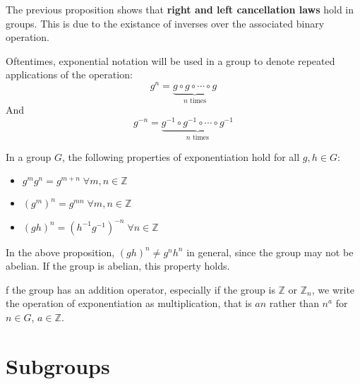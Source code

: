 \documentclass[12pt, letterpaper]{report}
\begin{document}
The previous proposition shows that \textbf{right and left cancellation laws} hold in groups. This is due to the existance of inverses over the associated binary operation.
\begin{notation}
	Oftentimes, exponential notation will be used in a group to denote repeated applications of the operation:
	\[
		g^n=\underbrace{g\circ g\circ \cdots\circ g}_{n\text{ times} }
	\]
	And
	\[
		g^{-n} =\underbrace{g^{-1} \circ g^{-1} \circ \cdots\circ g^{-1} }_{n\text{ times} }
	\]
\end{notation}
\begin{proposition}
	In a group \(G\), the following properties of exponentiation hold for all \(g,h\in G\):
	\begin{itemize}
		\item \(g^m g^n=g^{m+n} \;\forall m,n\in\mathbb{Z} \) 
		\item \(\left( g^m \right)^n=g^{mn}\;\forall m,n\in\mathbb{Z}   \)
		\item \((gh)^n =\left( h^{-1} g^{-1}  \right)^{-n}\;\forall n\in \mathbb{Z}   \)
	\end{itemize}
\end{proposition}
\begin{remark}
	In the above proposition, \((gh)^n \neq g^n h^n\) in general, since the group may not be abelian. If the group is abelian, this property holds.
\end{remark}
\begin{remark}
	f the group has an addition operator, especially if the group is \(\mathbb{Z} \) or \(\mathbb{Z} _n\), we write the operation of exponentiation as multiplication, that is \(an\) rather than \(n^a\) for \(n\in G\), \(a\in\mathbb{Z} \).
\end{remark}
\section{Subgroups}
\end{document}
